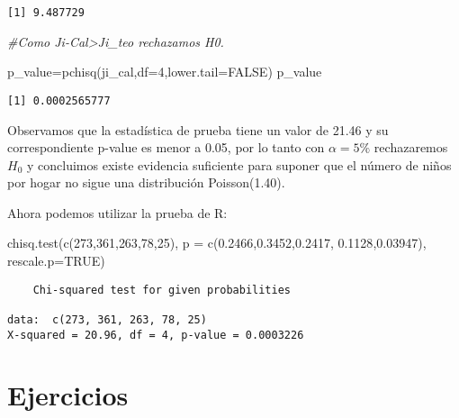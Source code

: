 \documentclass[
  a4paper,
  oneside,
  openany]{book}
\newenvironment{Shaded}{\begin{snugshade}}{\end{snugshade}}
\newcommand{\AttributeTok}[1]{\textcolor[rgb]{0.77,0.63,0.00}{#1}}
\newcommand{\CommentTok}[1]{\textcolor[rgb]{0.56,0.35,0.01}{\textit{#1}}}
\newcommand{\ConstantTok}[1]{\textcolor[rgb]{0.00,0.00,0.00}{#1}}
\newcommand{\DecValTok}[1]{\textcolor[rgb]{0.00,0.00,0.81}{#1}}
\newcommand{\FloatTok}[1]{\textcolor[rgb]{0.00,0.00,0.81}{#1}}
\newcommand{\FunctionTok}[1]{\textcolor[rgb]{0.00,0.00,0.00}{#1}}
\newcommand{\NormalTok}[1]{#1}
\newcommand{\OtherTok}[1]{\textcolor[rgb]{0.56,0.35,0.01}{#1}}
\begin{document}
\begin{verbatim}
[1] 9.487729
\end{verbatim}

\begin{Shaded}
\begin{Highlighting}[]
\CommentTok{\#Como Ji{-}Cal\textgreater{}Ji\_teo rechazamos H0.}

\NormalTok{p\_value}\OtherTok{=}\FunctionTok{pchisq}\NormalTok{(ji\_cal,}\AttributeTok{df=}\DecValTok{4}\NormalTok{,}\AttributeTok{lower.tail=}\ConstantTok{FALSE}\NormalTok{)}
\NormalTok{p\_value}
\end{Highlighting}
\end{Shaded}

\begin{verbatim}
[1] 0.0002565777
\end{verbatim}

Observamos que la estadística de prueba tiene un valor de 21.46 y su correspondiente p-value es menor a 0.05, por lo tanto con \(\alpha=5\%\) rechazaremos \(H_0\) y concluimos existe evidencia suficiente para suponer que el número de niños por hogar no sigue una distribución Poisson(1.40).

Ahora podemos utilizar la prueba de R:

\begin{Shaded}
\begin{Highlighting}[]
\FunctionTok{chisq.test}\NormalTok{(}\FunctionTok{c}\NormalTok{(}\DecValTok{273}\NormalTok{,}\DecValTok{361}\NormalTok{,}\DecValTok{263}\NormalTok{,}\DecValTok{78}\NormalTok{,}\DecValTok{25}\NormalTok{), }\AttributeTok{p =} \FunctionTok{c}\NormalTok{(}\FloatTok{0.2466}\NormalTok{,}\FloatTok{0.3452}\NormalTok{,}\FloatTok{0.2417}\NormalTok{,}
                                       \FloatTok{0.1128}\NormalTok{,}\FloatTok{0.03947}\NormalTok{), }\AttributeTok{rescale.p=}\ConstantTok{TRUE}\NormalTok{)}
\end{Highlighting}
\end{Shaded}

\begin{verbatim}
    Chi-squared test for given probabilities

data:  c(273, 361, 263, 78, 25)
X-squared = 20.96, df = 4, p-value = 0.0003226
\end{verbatim}

\hypertarget{ejercicios-11}{%
\section{Ejercicios}\label{ejercicios-11}}
\end{document}
